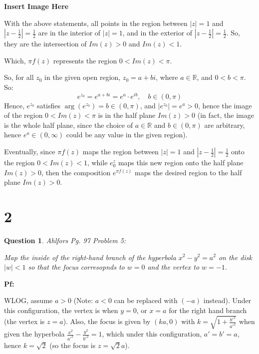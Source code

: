 \documentclass{article}
\newtheorem{question}{Question}
\begin{document}
\textbf{Insert Image Here}

\hfill

With the above statements, all points in the region between $|z|=1$ and $|z-\frac{1}{2}|=\frac{1}{2}$ are in the interior of $|z|=1$, and in the exterior of $|z-\frac{1}{2}|=\frac{1}{2}$.
So, they are the intersection of $Im(z)>0$ and $Im(z)<1$.

Which, $\pi f(z)$ represents the region $0<Im(z)<\pi$.

So, for all $z_0$ in the given open region, $z_0=a+bi$, where $a\in \mathbb{R}$, and $0<b<\pi$. So:
$$e^{z_0}=e^{a+bi}=e^a\cdot e^{ib},\quad b\in (0,\pi)$$
Hence, $e^{z_0}$ satisfies $\arg(e^{z_0})=b\in (0,\pi)$, and $|e^{z_0}|=e^a>0$, hence the image of the region $0<Im(z)<\pi$ is in the half plane $Im(z)>0$
(in fact, the image is the whole half plane, since the choice of $a\in \mathbb{R}$ and $b\in (0,\pi)$ are arbitrary, hence $e^a\in (0,\infty)$ could be any value in the given region).

\hfill

Eventually, since $\pi f(z)$ maps the region between $|z|=1$ and $|z-\frac{1}{2}|=\frac{1}{2}$ onto the region $0<Im(z)<1$,
while $e^z_0$ maps this new region onto the half plane $Im(z)>0$, then the composition $e^{\pi f(z)}$ maps the desired region to the half plane $Im(z)>0$.

\break

\section*{2}
\begin{myBox}[]{}
    \begin{question}
        Ahlfors Pg. 97 Problem 5:

        Map the inside of the right-hand branch of the hyperbola $x^2-y^2=a^2$ on the disk $|w|<1$
        so that the focus corresopnds to $w=0$ and the vertex to $w=-1$.
    \end{question}
\end{myBox}

\textbf{Pf:}

WLOG, assume $a>0$ (Note: $a<0$ can be replaced with $(-a)$ instead). Under this configuration, the vertex is when $y=0$, or $x=a$ for the right hand branch (the vertex is $z=a$).
Also, the focus is given by $(ka,0)$ with $k=\sqrt{1+\frac{b'^2}{a'^2}}$ when given the hyperbola $\frac{x^2}{a'^2}-\frac{y^2}{b'^2}=1$,
which under this configuration, $a'=b'=a$, hence $k=\sqrt{2}$ (so the focus is $z=\sqrt{2}a$).
\end{document}

